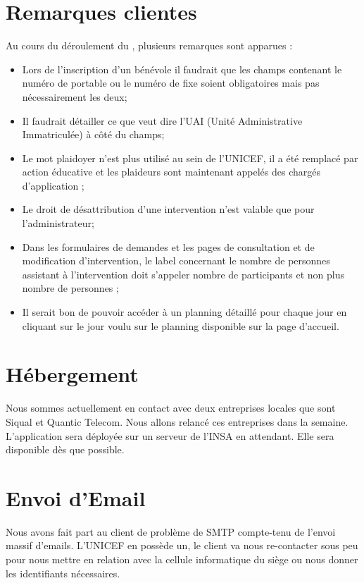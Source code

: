 \documentclass [a4paper] {article}
\begin{document}
\section{Remarques clientes}
Au cours du déroulement du \CDR, plusieurs remarques sont apparues  : 
\begin{itemize}
	\item Lors de l'inscription d'un bénévole il faudrait que les champs contenant le numéro de portable ou le numéro de fixe soient obligatoires mais pas nécessairement les deux;
	\item Il faudrait détailler ce que veut dire l'UAI (Unité Administrative Immatriculée) à côté du champs;
	\item Le mot \og plaidoyer \fg{} n'est plus utilisé au sein de l'UNICEF, il a été remplacé par \og action éducative \fg{} et  les plaideurs  sont maintenant appelés des chargés d'application ;
	\item Le droit de désattribution d'une intervention n'est valable que pour l'administrateur;
	\item Dans les formulaires de demandes et les pages de consultation et de modification d'intervention, le label concernant le nombre de personnes assistant à l'intervention doit s'appeler \og nombre de participants \fg{}  et non plus \og  nombre de personnes  \fg;
	\item Il serait bon de pouvoir accéder à un planning détaillé pour chaque jour en cliquant sur le jour voulu sur le planning disponible sur la page d'accueil.
\end{itemize}

\section{Hébergement}
Nous sommes actuellement en contact avec deux entreprises locales que sont Siqual et Quantic Telecom. Nous allons relancé ces entreprises dans la semaine. L'application sera déployée sur un serveur de l'INSA en attendant. Elle sera disponible dès que possible.

\section{Envoi d'Email}
Nous avons fait part au client de problème de SMTP compte-tenu de l'envoi massif d'emails. L'UNICEF en possède un, le client va nous re-contacter sous peu pour nous mettre en relation avec
la cellule informatique du siège ou nous donner les identifiants nécessaires.

\newpage
\end{document}
